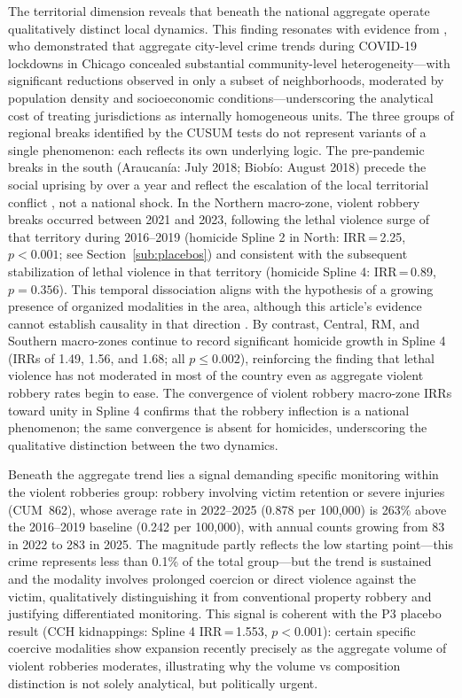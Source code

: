 \documentclass[pdflatex,sn-basic]{sn-jnl}
\begin{document}
The territorial dimension reveals that beneath the national aggregate operate qualitatively distinct local dynamics. This finding resonates with evidence from \citet{campedelli2020}, who demonstrated that aggregate city-level crime trends during COVID-19 lockdowns in Chicago concealed substantial community-level heterogeneity---with significant reductions observed in only a subset of neighborhoods, moderated by population density and socioeconomic conditions---underscoring the analytical cost of treating jurisdictions as internally homogeneous units. The three groups of regional breaks identified by the CUSUM tests do not represent variants of a single phenomenon: each reflects its own underlying logic. The pre-pandemic breaks in the south (Araucan\'ia: July 2018; Biob\'io: August 2018) precede the social uprising by over a year and reflect the escalation of the local territorial conflict \citep{izquierdo2024}, not a national shock. In the Northern macro-zone, violent robbery breaks occurred between 2021 and 2023, following the lethal violence surge of that territory during 2016--2019 (homicide Spline 2 in North: IRR\,=\,2.25, $p<0.001$; see Section~\ref{sub:placebos}) and consistent with the subsequent stabilization of lethal violence in that territory (homicide Spline 4: IRR\,=\,0.89, $p=0.356$). This temporal dissociation aligns with the hypothesis of a growing presence of organized modalities in the area, although this article's evidence cannot establish causality in that direction \citep{bravo2024,crespo2023}. By contrast, Central, RM, and Southern macro-zones continue to record significant homicide growth in Spline 4 (IRRs of 1.49, 1.56, and 1.68; all $p\leq0.002$), reinforcing the finding that lethal violence has not moderated in most of the country even as aggregate violent robbery rates begin to ease. The convergence of violent robbery macro-zone IRRs toward unity in Spline 4 confirms that the robbery inflection is a national phenomenon; the same convergence is absent for homicides, underscoring the qualitative distinction between the two dynamics.

Beneath the aggregate trend lies a signal demanding specific monitoring within the violent robberies group: robbery involving victim retention or severe injuries (CUM~862), whose average rate in 2022--2025 (0.878 per 100,000) is 263\% above the 2016--2019 baseline (0.242 per 100,000), with annual counts growing from 83 in 2022 to 283 in 2025. The magnitude partly reflects the low starting point---this crime represents less than 0.1\% of the total group---but the trend is sustained and the modality involves prolonged coercion or direct violence against the victim, qualitatively distinguishing it from conventional property robbery and justifying differentiated monitoring. This signal is coherent with the P3 placebo result (CCH kidnappings: Spline 4 IRR\,=\,1.553, $p<0.001$): certain specific coercive modalities show expansion recently precisely as the aggregate volume of violent robberies moderates, illustrating why the volume vs composition distinction is not solely analytical, but politically urgent.
\end{document}
